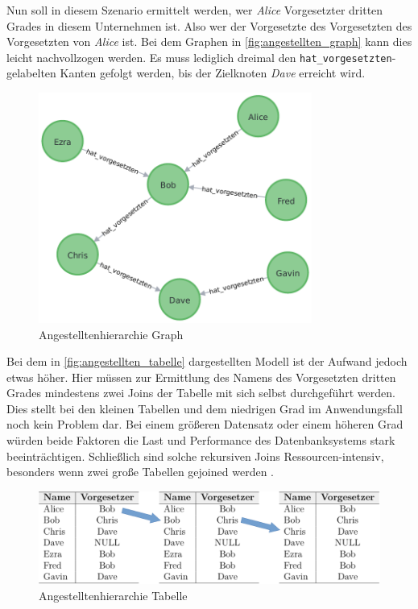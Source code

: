 Nun soll in diesem Szenario ermittelt werden, wer \textit{Alice} Vorgesetzter dritten Grades in diesem Unternehmen ist. Also wer der Vorgesetzte des Vorgesetzten des Vorgesetzten von \textit{Alice} ist. Bei dem Graphen in \autoref{fig:angestellten_graph} kann dies leicht nachvollzogen werden. Es muss lediglich dreimal den \texttt{hat\_vorgesetzten}-gelabelten Kanten gefolgt werden, bis der Zielknoten \textit{Dave} erreicht wird. 

\begin{figure}[ht]
    \centering
    \includegraphics[width=0.8\textwidth]{images/angestellten_graph.pdf}
    \caption{Angestelltenhierarchie Graph}
    \label{fig:angestellten_graph}
\end{figure}

Bei dem in \autoref{fig:angestellten_tabelle} dargestellten Modell ist der Aufwand jedoch etwas höher. Hier müssen zur Ermittlung des Namens des Vorgesetzten dritten Grades mindestens zwei Joins der Tabelle mit sich selbst durchgeführt werden. Dies stellt bei den kleinen Tabellen und dem niedrigen Grad im Anwendungsfall noch kein Problem dar. Bei einem größeren Datensatz oder einem höheren Grad würden beide Faktoren die Last und Performance des Datenbanksystems stark beeinträchtigen. Schließlich sind solche rekursiven Joins Ressourcen-intensiv, besonders wenn zwei große Tabellen gejoined werden \cite{gdbms}. 

\begin{figure}[ht]
    \centering
    \includegraphics[width=\textwidth]{images/angestellte_tabellen.pdf}
    \caption{Angestelltenhierarchie Tabelle}
    \label{fig:angestellten_tabelle}
\end{figure}

